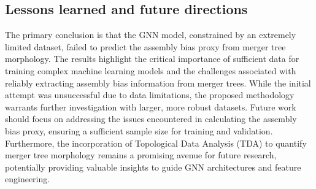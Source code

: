 \documentclass[twocolumn]{aastex631}
\begin{document}
\subsection{Lessons learned and future directions}

The primary conclusion is that the GNN model, constrained by an extremely limited dataset, failed to predict the assembly bias proxy from merger tree morphology. The results highlight the critical importance of sufficient data for training complex machine learning models and the challenges associated with reliably extracting assembly bias information from merger trees. While the initial attempt was unsuccessful due to data limitations, the proposed methodology warrants further investigation with larger, more robust datasets. Future work should focus on addressing the issues encountered in calculating the assembly bias proxy, ensuring a sufficient sample size for training and validation. Furthermore, the incorporation of Topological Data Analysis (TDA) to quantify merger tree morphology remains a promising avenue for future research, potentially providing valuable insights to guide GNN architectures and feature engineering.
\

{}

\end{document}
